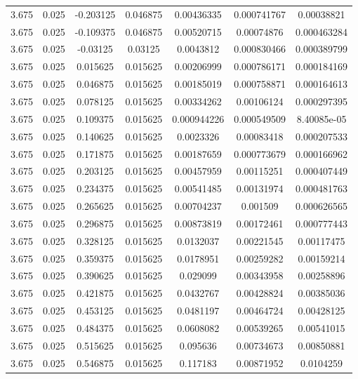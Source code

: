 \begin{table}[bh]
\begin{center}
{\begin{tabular}{ccccccc}
3.675	 & 0.025 & 	-0.203125	 & 0.046875	 & 0.00436335	 & 0.000741767	 & 0.00038821 \\ 
3.675	 & 0.025 & 	-0.109375	 & 0.046875	 & 0.00520715	 & 0.00074876	 & 0.000463284 \\ 
3.675	 & 0.025 & 	-0.03125	 & 0.03125	 & 0.0043812	 & 0.000830466	 & 0.000389799 \\ 
3.675	 & 0.025 & 	0.015625	 & 0.015625	 & 0.00206999	 & 0.000786171	 & 0.000184169 \\ 
3.675	 & 0.025 & 	0.046875	 & 0.015625	 & 0.00185019	 & 0.000758871	 & 0.000164613 \\ 
3.675	 & 0.025 & 	0.078125	 & 0.015625	 & 0.00334262	 & 0.00106124	 & 0.000297395 \\ 
3.675	 & 0.025 & 	0.109375	 & 0.015625	 & 0.000944226	 & 0.000549509	 & 8.40085e-05 \\ 
3.675	 & 0.025 & 	0.140625	 & 0.015625	 & 0.0023326	 & 0.00083418	 & 0.000207533 \\ 
3.675	 & 0.025 & 	0.171875	 & 0.015625	 & 0.00187659	 & 0.000773679	 & 0.000166962 \\ 
3.675	 & 0.025 & 	0.203125	 & 0.015625	 & 0.00457959	 & 0.00115251	 & 0.000407449 \\ 
3.675	 & 0.025 & 	0.234375	 & 0.015625	 & 0.00541485	 & 0.00131974	 & 0.000481763 \\ 
3.675	 & 0.025 & 	0.265625	 & 0.015625	 & 0.00704237	 & 0.001509	 & 0.000626565 \\ 
3.675	 & 0.025 & 	0.296875	 & 0.015625	 & 0.00873819	 & 0.00172461	 & 0.000777443 \\ 
3.675	 & 0.025 & 	0.328125	 & 0.015625	 & 0.0132037	 & 0.00221545	 & 0.00117475 \\ 
3.675	 & 0.025 & 	0.359375	 & 0.015625	 & 0.0178951	 & 0.00259282	 & 0.00159214 \\ 
3.675	 & 0.025 & 	0.390625	 & 0.015625	 & 0.029099	 & 0.00343958	 & 0.00258896 \\ 
3.675	 & 0.025 & 	0.421875	 & 0.015625	 & 0.0432767	 & 0.00428824	 & 0.00385036 \\ 
3.675	 & 0.025 & 	0.453125	 & 0.015625	 & 0.0481197	 & 0.00464724	 & 0.00428125 \\ 
3.675	 & 0.025 & 	0.484375	 & 0.015625	 & 0.0608082	 & 0.00539265	 & 0.00541015 \\ 
3.675	 & 0.025 & 	0.515625	 & 0.015625	 & 0.095636	 & 0.00734673	 & 0.00850881 \\ 
3.675	 & 0.025 & 	0.546875	 & 0.015625	 & 0.117183	 & 0.00871952	 & 0.0104259 \\ 

\end{tabular}}
\end{center}
\end{table}
